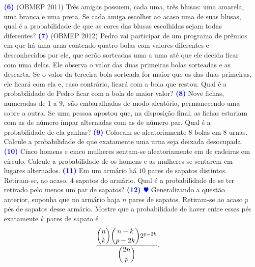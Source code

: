 \documentclass[12pt, a4paper]{article}
\begin{document}
\textcolor{blue}{\bf(6)} (OBMEP 2011) Três amigas possuem, cada uma, três blusas: uma amarela, uma branca e uma preta.
Se cada amiga escolher ao acaso uma de suas blusas, qual é a probabilidade de que as cores das blusas escolhidas sejam todas diferentes?
\newline\newline
\textcolor{blue}{\bf(7)} (OBMEP 2012) Pedro vai participar de um programa de prêmios em que há uma urna contendo
quatro bolas com valores diferentes e desconhecidos por ele, que serão sorteadas uma a uma até que ele decida ficar com uma delas. Ele observa o valor das duas primeiras bolas sorteadas e as descarta. Se o valor da terceira bola sorteada for maior que os das duas primeiras, ele ficará com ela e, caso contrário, ficará com a bola que restou. Qual é a probabilidade de Pedro ficar com a bola de maior valor?
\newline\newline
\textcolor{blue}{\bf(8)} Nove fichas, numeradas de $1$ a $9,$ são embaralhadas de modo aleatório, permanecendo uma sobre a outra. Se uma pessoa apostou que, na disposição final, as fichas estariam com as de número ímpar alternadas com as de número par. Qual é a probabilidade de ela ganhar?
\newline
\newline
\textcolor{blue}{\bf(9)} Colocam-se aleatoriamente $8$ bolas em $8$ urnas. Calcule a probabilidade de que exatamente uma urna seja deixada desocupada.
\newline
\newline
\textcolor{blue}{\bf(10)} Cinco homens e cinco mulheres sentam-se aleatoriamente em de cadeiras em círculo. Calcule a probabilidade de os homens e as mulheres se sentarem em lugares alternados.
\newline
\newline
\textcolor{blue}{\bf(11)} Em um armário há $10$ pares de sapatos distintos. Retiram-se, ao acaso, $4$ sapatos do armário. Qual é a probabilidade de se ter retirado pelo menos um par de sapatos?
\newline\newline
\textcolor{blue}{\bf(12) $\varheart$} Generalizando a questão anterior, suponha que no armário haja $n$ pares de sapatos. Retiram-se ao acaso $p$ pés de sapatos desse armário. Mostre que a probabilidade de haver entre esses pés exatamente $k$ pares de sapato é \[\dfrac{\dbinom{n}{k} \dbinom{n-k}{p-2k} 2^{p-2k}}{\dbinom{2n}{p}}.\]\newline \newline
\end{document}
